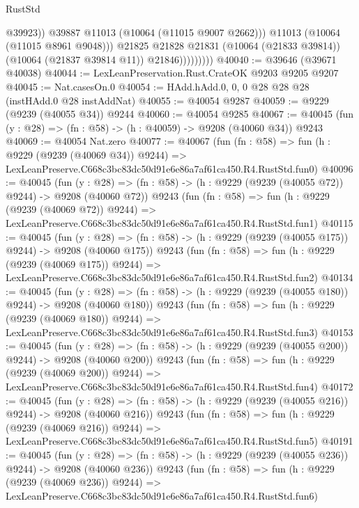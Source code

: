 \begin{lexlean}{RustStd}
\begin{coremodule}
                              @39923))
                          @39887
                          @11013
                          (@10064 (@11015 @9007 @2662)))
                        @11013
                        (@10064 (@11015 @8961 @9048)))
                      @21825
                      @21828
                      @21831
                      (@10064 (@21833 @39814))
                      (@10064 (@21837 @39814 @11))
                      @21846)))))))))
@40040 := @39646 (@39671 @40038)
@40044 := LexLeanPreservation.Rust.CrateOK @9203 @9205 @9207
@40045 := Nat.casesOn.{0}
@40054 := HAdd.hAdd.{0, 0, 0} @28 @28 @28 (instHAdd.{0} @28 instAddNat)
@40055 := @40054 @9287
@40059 := @9229 (@9239 (@40055 @34)) @9244
@40060 := @40054 @9285
@40067 := @40045 (fun (y : @28) => (fn : @58) -> (h : @40059) -> @9208 (@40060 @34)) @9243
@40069 := @40054 Nat.zero
@40077 := @40067
    (fun (fn : @58) =>
    fun (h : @9229 (@9239 (@40069 @34)) @9244) =>
    LexLeanPreserve.C668c3bc83dc50d91e6e86a7af61ca450.R4.RustStd.fun0)
@40096 := @40045
    (fun (y : @28) => (fn : @58) -> (h : @9229 (@9239 (@40055 @72)) @9244) -> @9208 (@40060 @72))
    @9243
    (fun (fn : @58) =>
    fun (h : @9229 (@9239 (@40069 @72)) @9244) =>
    LexLeanPreserve.C668c3bc83dc50d91e6e86a7af61ca450.R4.RustStd.fun1)
@40115 := @40045
    (fun (y : @28) => (fn : @58) -> (h : @9229 (@9239 (@40055 @175)) @9244) -> @9208 (@40060 @175))
    @9243
    (fun (fn : @58) =>
    fun (h : @9229 (@9239 (@40069 @175)) @9244) =>
    LexLeanPreserve.C668c3bc83dc50d91e6e86a7af61ca450.R4.RustStd.fun2)
@40134 := @40045
    (fun (y : @28) => (fn : @58) -> (h : @9229 (@9239 (@40055 @180)) @9244) -> @9208 (@40060 @180))
    @9243
    (fun (fn : @58) =>
    fun (h : @9229 (@9239 (@40069 @180)) @9244) =>
    LexLeanPreserve.C668c3bc83dc50d91e6e86a7af61ca450.R4.RustStd.fun3)
@40153 := @40045
    (fun (y : @28) => (fn : @58) -> (h : @9229 (@9239 (@40055 @200)) @9244) -> @9208 (@40060 @200))
    @9243
    (fun (fn : @58) =>
    fun (h : @9229 (@9239 (@40069 @200)) @9244) =>
    LexLeanPreserve.C668c3bc83dc50d91e6e86a7af61ca450.R4.RustStd.fun4)
@40172 := @40045
    (fun (y : @28) => (fn : @58) -> (h : @9229 (@9239 (@40055 @216)) @9244) -> @9208 (@40060 @216))
    @9243
    (fun (fn : @58) =>
    fun (h : @9229 (@9239 (@40069 @216)) @9244) =>
    LexLeanPreserve.C668c3bc83dc50d91e6e86a7af61ca450.R4.RustStd.fun5)
@40191 := @40045
    (fun (y : @28) => (fn : @58) -> (h : @9229 (@9239 (@40055 @236)) @9244) -> @9208 (@40060 @236))
    @9243
    (fun (fn : @58) =>
    fun (h : @9229 (@9239 (@40069 @236)) @9244) =>
    LexLeanPreserve.C668c3bc83dc50d91e6e86a7af61ca450.R4.RustStd.fun6)

\end{coremodule}
\end{lexlean}
